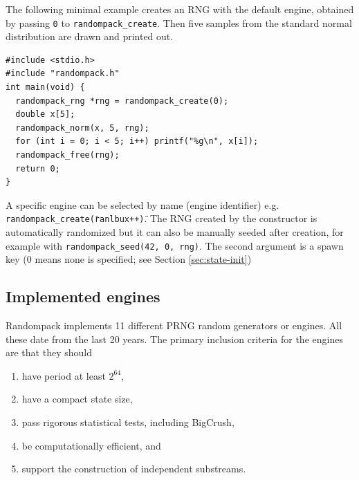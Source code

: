 \documentclass[manuscript,screen,review]{acmart}
\begin{document}
The following minimal example creates an RNG with the default engine,
obtained by passing \texttt{0} to \texttt{randompack\_create}. Then five
samples from the standard normal distribution are drawn and printed out.

\begin{lstlisting}[style=tightcode]
#include <stdio.h>
#include "randompack.h"
int main(void) {
  randompack_rng *rng = randompack_create(0);
  double x[5];
  randompack_norm(x, 5, rng);
  for (int i = 0; i < 5; i++) printf("%g\n", x[i]);
  randompack_free(rng);
  return 0;
}
\end{lstlisting}

A specific engine can be selected by name (engine identifier) e.g.
\texttt{randompack\_create(\"ranlbux++\")}. The RNG created by the
constructor is automatically randomized but it can also be manually
seeded after creation, for example with \texttt{randompack\_seed(42,
0, rng)}. The second argument is a spawn key (0 means none is
specified; see Section \ref{sec:state-init})

\subsection{Implemented engines}
Randompack implements 11 different PRNG random generators or engines.
All these date from the last 20 years. The primary inclusion criteria
for the engines are that they should

\begin{enumerate}
\item have period at least $2^{64}$,
\item have a compact state size,
\item pass rigorous statistical tests, including BigCrush,
\item be computationally efficient, and
\item support the construction of independent substreams.
\end{enumerate}

\newcommand{\scrambledandweb}{\cite{blackman2021scrambled,vigna2026shootout}}
\newcommand{\oneillpcgandpost}{\cite{oneill2014pcg,oneill2019pcg64dxsm-post}}
\end{document}
